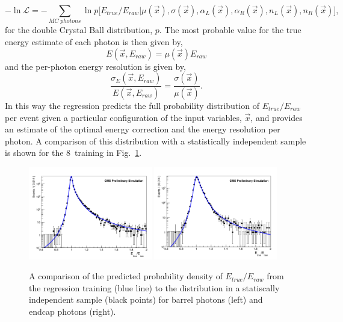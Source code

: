 \begin{equation}
  -\ln \mathcal{L} = - \sum_{MC \; photons} \ln p\bigl[E_{true}/E_{raw} | \mu(\vec{x}),\sigma(\vec{x}),\alpha_{L}(\vec{x}),\alpha_{R}(\vec{x}),n_{L}(\vec{x}),n_{R}(\vec{x})\bigr],
\end{equation}
for the double Crystal Ball distribution, $p$. The most probable value for the true energy estimate of each photon is then given by,
\begin{equation}
  E(\vec{x},E_{raw}) = \mu(\vec{x})E_{raw}
\end{equation}
and the per-photon energy resolution is given by, 
\begin{equation}
  \frac{\sigma_{E}(\vec{x},E_{raw})}{E(\vec{x},E_{raw})} = \frac{\sigma(\vec{x})}{\mu(\vec{x})}.
\end{equation}
In this way the regression predicts the full probability distribution of $E_{true}/E_{raw}$ per event given a particular configuration of the input variables, $\vec{x}$, and provides an estimate of the optimal energy correction and the energy resolution per photon. A comparison of this distribution with a statistically independent \MC sample is shown for the 8~\TeV training in Fig.~\ref{fig:regression_training}. 

\begin{figure}
  \includegraphics[width=0.48\textwidth]{analysis_comps/plots/regression_barrel_fix.pdf}
  \includegraphics[width=0.48\textwidth]{analysis_comps/plots/regression_endcap_fix.pdf}
  \caption[A comparison of the predicted probability density of $E_{true}/E_{raw}$ from the regression training to the distribution in a statistically independent sample]{A comparison of the predicted probability density of $E_{true}/E_{raw}$ from the regression training (blue line) to the distribution in a statiscally independent \MC sample (black points) for barrel photons (left) and endcap photons (right).}
  \label{fig:regression_training}
\end{figure}

